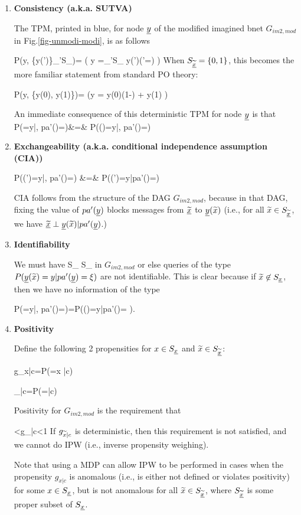 \begin{enumerate}


\item {\bf Consistency (a.k.a. SUTVA)}

The TPM, printed in  blue, for node ${\underline{y}}$
of the modified imagined bnet $G_{im2,mod}$ in Fig.\ref{fig-unmodi-modi},
 is as follows

\beq \color{blue}
P(y\cond \tilx, \{y(\tilx')\}_{\tilx'\in S_{\ul{\tilx}}})=
\indi(
\quad y =\sum_{\tilx'\in S_{\ul{\tilx}}}
 y(\tilx')\indi(\tilx'=\tilx)
 \quad)
\eeq
When $S_{\underline{{\widetilde{x}}}}=\{0,1\}$,
this becomes the more familiar 
statement from standard 
PO theory:

\beq \color{blue}
P(y\cond \tilx, \{y(0), y(1)\})=
\indi(\quad y =
y(0)(1-\tilx)
+ 
y(1)\tilx
\quad)
\eeq

An immediate consequence
of this deterministic TPM for
node ${\underline{y}}$ is that
\beqa
P(\rvy=y|\tilx, pa'(\rvy)=\xi)&=&
P(\rvy(\tilx)=y|\tilx, pa'(\rvy)=\xi)
\eeqa


\item {\bf Exchangeability (a.k.a.
conditional independence assumption (CIA))}

\beqa
P(\rvy(\tilx')=y|\tilx, pa'(\rvy)=\xi)
&=&
P(\rvy(\tilx')=y|pa'(\rvy)=\xi)
\eeqa

CIA follows from the structure
of the DAG $G_{im2,mod}$,
because in that
DAG, fixing the value
of $pa'({\underline{y}})$
blocks messages from $\underline{{\widetilde{x}}}$
to ${\underline{y}}({\widetilde{x}})$ (i.e.,
for all ${\widetilde{x}}\in S_{\underline{{\widetilde{x}}}}$,
we have  
$\underline{{\widetilde{x}}}
\perp {\underline{y}}({\widetilde{x}})|pa'({\underline{y}})$.)

\item {\bf Identifiability}

We must have
\beq
S_{\ul{\tilx}} \subset S_\rvx
\eeq
in $G_{im2, mod}$
or else queries of the type
 $P({\underline{y}}({\widetilde{x}})=y|pa'({\underline{y}})=\xi)$ are not identifiable.
This is clear because if ${\widetilde{x}}\not\in S_{\underline{x}}$,
then we have no information of the type

\beq
P(\rvy=y|\tilx, pa'(\rvy)=\xi)=P(\rvy(\tilx)=y|pa'(\rvy)=\xi
)\;.
\eeq

\item{\bf Positivity}

Define the following 2 propensities
for $x\in S_{\underline{x}}$ and ${\widetilde{x}} \in S_{\underline{{\widetilde{x}}}}$:

\beq
g_{x|c}=P(\rvx=x |c)
\eeq

\beq
\tilg_{\tilx|c}=P(\ul{\tilx}=\tilx |c)
\eeq

Positivity for  $G_{im2,mod}$
is the requirement that

<g_{\tilx|c}<1 
\eeq
If $g_{{\widetilde{x}}|c}$
is deterministic, then this requirement
is not satisfied, and we cannot do IPW (i.e.,
inverse propensity weighing).

Note that using a MDP can allow IPW to
be performed  in cases
when the propensity $g_{x|c}$
is anomalous
(i.e., is
either not defined
or violates positivity)
for some $x\in S_{\underline{x}}$, but is not anomalous
for all ${\widetilde{x}}\in S_{\underline{{\widetilde{x}}}}$, where
$S_{\underline{{\widetilde{x}}}}$
is some proper subset of $S_{\underline{x}}$.

\end{enumerate}

